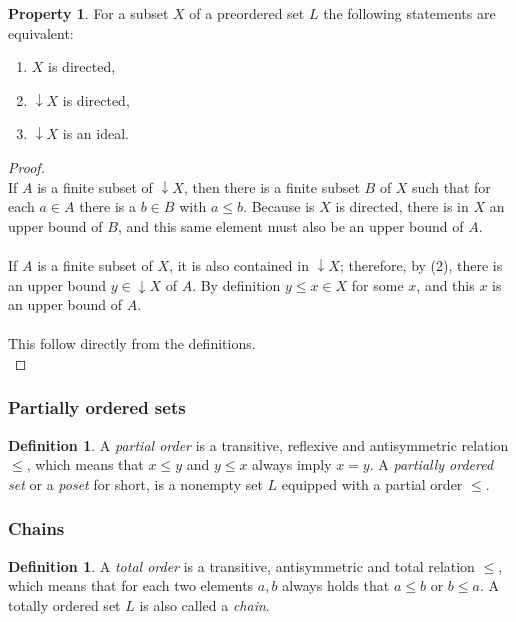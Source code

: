 \documentclass[a4paper,12pt]{article}
\theoremstyle{definition}
\newtheorem{property}[theorem]{Property}
\newtheorem{definition}[theorem]{Definition}
\begin{document}
\begin{property}
For a subset $X$ of a preordered set $L$ the following statements are equivalent:
\begin{enumerate}
  \item $X$ is directed,
  \item $\downarrow X$ is directed,
  \item $\downarrow X$ is an ideal.
\end{enumerate}
\end{property}

\begin{proof}
\\
If $A$ is a finite subset of $\downarrow X$, then there is a finite subset $B$ of $X$ such that for each $a \in A$ there is a $b \in B$ with $a \leq b$. Because is $X$ is directed, there is in $X$ an upper bound of $B$, and this same element must also be an upper bound of $A$.\\

\\
If $A$ is a finite subset of $X$, it is also contained in $\downarrow X$; therefore, by (2), there is an upper bound $y \in \downarrow X$ of $A$. By definition $y \leq x \in X$ for some $x$, and this $x$ is an upper bound of $A$.\\

\\
This follow directly from the definitions.\\
\end{proof}

\subsubsection{Partially ordered sets}
\begin{definition}
A \emph{partial order} is a transitive, reflexive and antisymmetric relation $\leq$, which means that $x \leq y$ and $y \leq x$ always imply $x = y$. A \emph{partially ordered set} or a \emph{poset} for short, is a nonempty set $L$ equipped with a partial order $\leq$.
\end{definition}

\subsubsection{Chains}
\begin{definition}
A \emph{total order} is a transitive, antisymmetric and total relation $\leq$, which means that for each two elements $a,b$ always holds that $a \leq b$ or $b \leq a$. A totally ordered set $L$ is also called a \emph{chain}.
\end{definition}
\end{document}
